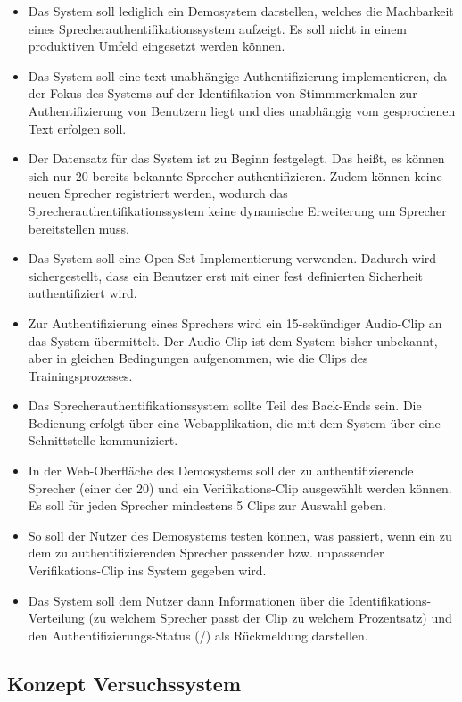 \begin{itemize}
    \item Das System soll lediglich ein Demosystem darstellen, welches die Machbarkeit eines Sprecherauthentifikationssystem aufzeigt. Es soll nicht in einem produktiven Umfeld eingesetzt werden können.
    \item Das System soll eine text-unabhängige Authentifizierung implementieren, da der Fokus des Systems auf der Identifikation von Stimmmerkmalen zur Authentifizierung von Benutzern liegt und dies unabhängig vom gesprochenen Text erfolgen soll.
    \item Der Datensatz für das System ist zu Beginn festgelegt. Das heißt, es können sich nur 20 bereits bekannte Sprecher authentifizieren. Zudem können keine neuen Sprecher registriert werden, wodurch das Sprecherauthentifikationssystem keine dynamische Erweiterung um Sprecher bereitstellen muss.
    \item Das System soll eine Open-Set-Implementierung verwenden. Dadurch wird sichergestellt, dass ein Benutzer erst mit einer fest definierten Sicherheit authentifiziert wird.
    \item Zur Authentifizierung eines Sprechers wird ein 15-sekündiger Audio-Clip an das System übermittelt. Der Audio-Clip ist dem System bisher unbekannt, aber in gleichen Bedingungen aufgenommen, wie die Clips des Trainingsprozesses.
    \item Das Sprecherauthentifikationssystem sollte Teil des Back-Ends sein. Die Bedienung erfolgt über eine Webapplikation, die mit dem System über eine Schnittstelle kommuniziert.
    \item In der Web-Oberfläche des Demosystems soll der zu authentifizierende Sprecher (einer der 20) und ein Verifikations-Clip ausgewählt werden können. Es soll für jeden Sprecher mindestens 5 Clips zur Auswahl geben.
    \item So soll der Nutzer des Demosystems testen können, was passiert, wenn ein zu dem zu authentifizierenden Sprecher passender bzw. unpassender Verifikations-Clip ins System gegeben wird.
    \item Das System soll dem Nutzer dann Informationen über die Identifikations-Verteilung (zu welchem Sprecher passt der Clip zu welchem Prozentsatz) und den Authentifizierungs-Status (/) als Rückmeldung darstellen.
\end{itemize}

\subsection{Konzept Versuchssystem}

